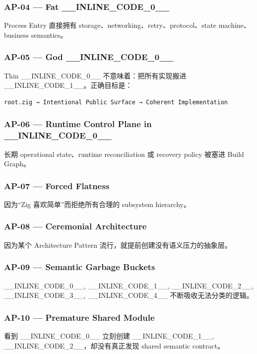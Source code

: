 \documentclass[11pt,a4paper]{article}
\begin{document}
\subsubsection{AP-04 — Fat \_\_INLINE\_CODE\_0\_\_}
Process Entry 直接拥有 storage、networking、retry、protocol、state machine、business semantics。

\subsubsection{AP-05 — God \_\_INLINE\_CODE\_0\_\_}
Thin \_\_INLINE\_CODE\_0\_\_ 不意味着：把所有实现搬进 \_\_INLINE\_CODE\_1\_\_。正确目标是：

\begin{lstlisting}[language=text]
root.zig → Intentional Public Surface → Coherent Implementation
\end{lstlisting}
\subsubsection{AP-06 — Runtime Control Plane in \_\_INLINE\_CODE\_0\_\_}
长期 operational state、runtime reconciliation 或 recovery policy 被塞进 Build Graph。

\subsubsection{AP-07 — Forced Flatness}
因为“Zig 喜欢简单”而拒绝所有合理的 subsystem hierarchy。

\subsubsection{AP-08 — Ceremonial Architecture}
因为某个 Architecture Pattern 流行，就提前创建没有语义压力的抽象层。

\subsubsection{AP-09 — Semantic Garbage Buckets}
\_\_INLINE\_CODE\_0\_\_, \_\_INLINE\_CODE\_1\_\_, \_\_INLINE\_CODE\_2\_\_, \_\_INLINE\_CODE\_3\_\_, \_\_INLINE\_CODE\_4\_\_ 不断吸收无法分类的逻辑。

\subsubsection{AP-10 — Premature Shared Module}
看到 \_\_INLINE\_CODE\_0\_\_ 立刻创建 \_\_INLINE\_CODE\_1\_\_, \_\_INLINE\_CODE\_2\_\_，却没有真正发现 shared semantic contract。
\end{document}
